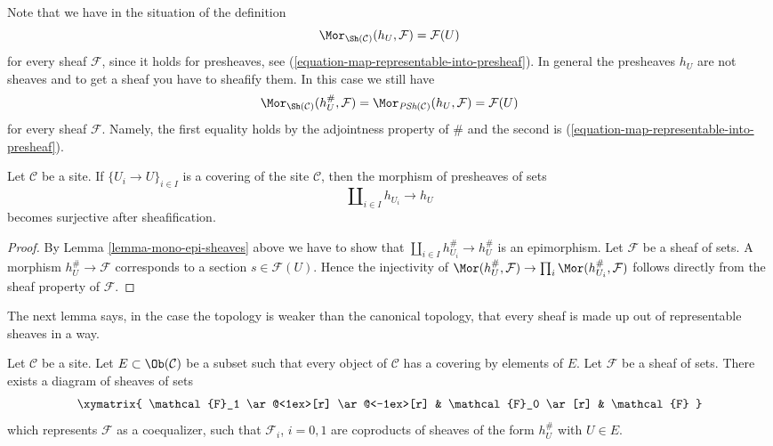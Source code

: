 \noindent
Note that we have in the situation of the definition
$$
\Mor_{\Sh(\mathcal{C})}(h_U, \mathcal{F}) = \mathcal{F}(U)
$$
for every sheaf $\mathcal{F}$, since it holds for presheaves, see
(\ref{equation-map-representable-into-presheaf}). In general the
presheaves $h_U$ are not sheaves and to get a sheaf you have to
sheafify them. In this case we still have
\begin{equation}
\label{equation-map-representable-into-sheaf}
\Mor_{\Sh(\mathcal{C})}(h_U^\#, \mathcal{F}) =
\Mor_{\textit{PSh}(\mathcal{C})}(h_U, \mathcal{F}) =
\mathcal{F}(U)
\end{equation}
for every sheaf $\mathcal{F}$. Namely, the first equality holds
by the adjointness property of $\#$ and the second is
(\ref{equation-map-representable-into-presheaf}).

\begin{lemma}
\label{lemma-covering-surjective-after-sheafification}
Let $\mathcal{C}$ be a site. If
$\{U_i \to U\}_{i \in I}$ is a covering of the site
$\mathcal{C}$, then the morphism of presheaves of sets
$$
\coprod\nolimits_{i \in I} h_{U_i} \to h_U
$$
becomes surjective after sheafification.
\end{lemma}

\begin{proof}
By Lemma \ref{lemma-mono-epi-sheaves} above we have to show that
$\coprod\nolimits_{i \in I} h_{U_i}^\# \to h_U^\#$
is an epimorphism. Let $\mathcal{F}$ be a sheaf of sets.
A morphism $h_U^\# \to \mathcal{F}$
corresponds to a section $s \in \mathcal{F}(U)$.
Hence the injectivity of $\Mor(h_U^\#, \mathcal{F})
\to \prod_i \Mor(h_{U_i}^\#, \mathcal{F})$ follows
directly from the sheaf property of $\mathcal{F}$.
\end{proof}

\noindent
The next lemma says, in the case the topology is weaker than the
canonical topology, that every sheaf is made up out of
representable sheaves in a way.

\begin{lemma}
\label{lemma-sheaf-coequalizer-representable}
Let $\mathcal{C}$ be a site. Let $E \subset \Ob(\mathcal{C})$ be a
subset such that every object of $\mathcal{C}$ has a covering by
elements of $E$. Let $\mathcal{F}$ be a sheaf of sets. There exists a
diagram of sheaves of sets
$$
\xymatrix{
\mathcal{F}_1 \ar@<1ex>[r] \ar@<-1ex>[r] &
\mathcal{F}_0 \ar[r] &
\mathcal{F}
}
$$
which represents $\mathcal{F}$ as a coequalizer,
such that $\mathcal{F}_i$, $i = 0, 1$ are coproducts
of sheaves of the form $h_U^\#$ with $U \in E$.
\end{lemma}

